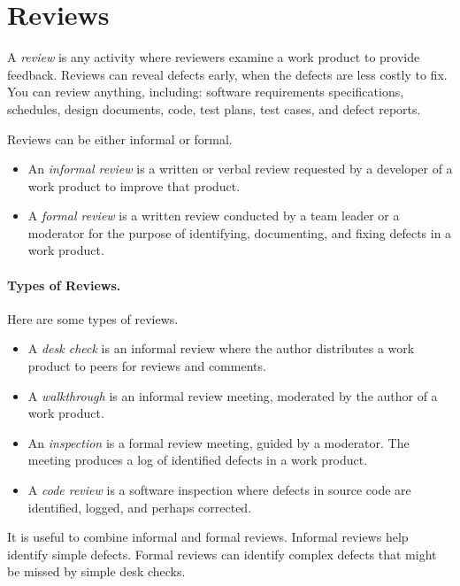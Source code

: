 





\section*{Reviews}

A \emph{review} is any activity where reviewers examine a work product
to provide feedback.  Reviews can reveal defects early, when the
defects are less costly to fix.  You can review anything, including:
software requirements specifications, schedules, design documents,
code, test plans, test cases, and defect reports.

Reviews can be either informal or formal.
\begin{itemize}
\item An \emph{informal review} is a written or verbal review
  requested by a developer of a work product to improve that product.
\item A \emph{formal review} is a written review conducted by a team
  leader or a moderator for the purpose of identifying, documenting,
  and fixing defects in a work product.  
\end{itemize}

\paragraph{Types of Reviews.}
Here are some types of reviews.
\begin{itemize}
\item A \emph{desk check} is an informal review where the author distributes
a work product to peers for reviews and comments.
\item A \emph{walkthrough} is an informal review meeting, moderated by the author of a work product.
\item An \emph{inspection} is a formal review meeting, guided by a moderator. The meeting produces a log of identified defects in a work product.
\item A \emph{code review} is a software inspection where defects in source code are identified, logged, and perhaps corrected.
\end{itemize}

It is useful to combine informal and formal reviews. Informal reviews
help identify simple defects. Formal reviews can identify complex
defects that might be missed by simple desk checks.

